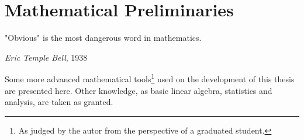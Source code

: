 \chapter{Mathematical Preliminaries}
\label{c:math}
\epigraph{"Obvious" is the most dangerous word in mathematics.}{\textit{Eric Temple
Bell}, 1938}

Some more advanced mathematical tools\footnote{As judged by the autor
from the perspective of a graduated student.} used on the development of this
thesis are presented here.
Other knowledge, as basic linear algebra, statistics and analysis, are taken as
granted.



